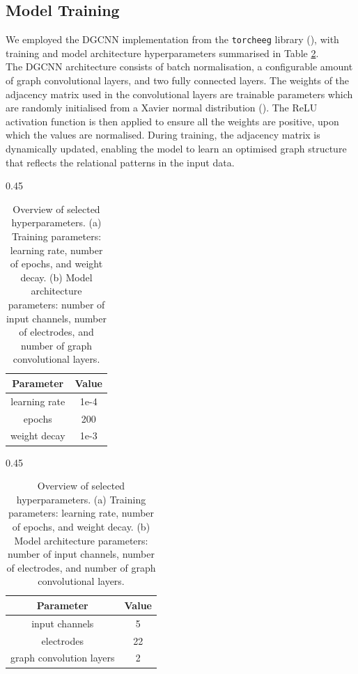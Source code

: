 \subsection{Model Training}
We employed the DGCNN implementation from the \texttt{torcheeg} library (\cite{torcheeg}), with training and model architecture hyperparameters summarised in Table \ref{tab:parameters}.
\vspace{0.5em}\\
The  DGCNN architecture consists of batch normalisation, a configurable amount of graph convolutional layers, and two fully connected layers. The weights of the adjacency matrix used in the convolutional layers are trainable parameters which are randomly initialised from a Xavier normal distribution (\cite{Xavier}). The ReLU activation function is then applied to ensure all the weights are positive, upon which the values are normalised. During training, the adjacency matrix is dynamically updated, enabling the model to learn an optimised graph structure that reflects the relational patterns in the input data.
\begin{table}[!ht]
    \centering
    \begin{subtable}[t]{0.45\textwidth}
        \centering
        \begin{tabular}{|c|c|}
            \hline
            \textbf{Parameter} & \textbf{Value} \\
            \hline
            learning rate & 1e-4 \\
            epochs & 200 \\
            weight decay & 1e-3 \\
            \hline
        \end{tabular}
        \caption{Training parameters}
    \end{subtable}
    \hfill
    \begin{subtable}[t]{0.45\textwidth}
        \centering
        \begin{tabular}{|c|c|}
            \hline
            \textbf{Parameter} & \textbf{Value} \\
            \hline
            input channels & 5 \\
            electrodes & 22 \\
            graph convolution layers & 2 \\
            \hline
        \end{tabular}
        \caption{Model architecture parameters}
    \end{subtable}
    \caption{Overview of selected hyperparameters. (a) Training parameters: learning rate, number of epochs, and weight decay. (b) Model architecture parameters: number of input channels, number of electrodes, and number of graph convolutional layers.}
    \label{tab:parameters}
\end{table}


